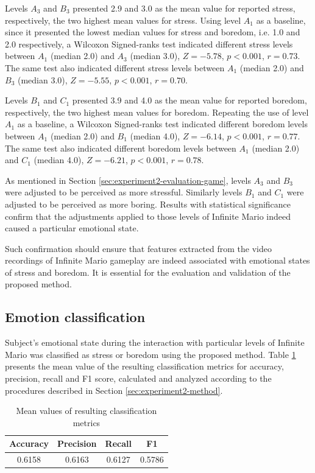 Levels $A_3$ and $B_3$ presented 2.9 and 3.0 as the mean value for reported stress, respectively, the two highest mean values for stress. Using level $A_1$ as a baseline, since it presented the lowest median values for stress and boredom, i.e. 1.0 and 2.0 respectively, a Wilcoxon Signed-ranks test indicated different stress levels between $A_1$ (median 2.0) and $A_3$ (median 3.0), $Z=-5.78$, $p < 0.001$, $r=0.73$. The same test also indicated different stress levels between $A_1$ (median 2.0) and $B_3$ (median 3.0), $Z=-5.55$, $p < 0.001$, $r=0.70$.

Levels $B_1$ and $C_1$ presented 3.9 and 4.0 as the mean value for reported boredom, respectively, the two highest mean values for boredom. Repeating the use of level $A_1$ as a baseline, a Wilcoxon Signed-ranks test indicated different boredom levels between $A_1$ (median 2.0) and $B_1$ (median 4.0), $Z=-6.14$, $p < 0.001$, $r=0.77$. The same test also indicated different boredom levels between $A_1$ (median 2.0) and $C_1$ (median 4.0), $Z=-6.21$, $p < 0.001$, $r=0.78$.

As mentioned in Section \ref{sec:experiment2-evaluation-game}, levels $A_3$ and $B_3$ were adjusted to be perceived as more stressful. Similarly levels $B_1$ and $C_1$ were adjusted to be perceived as more boring. Results with statistical significance confirm that the adjustments applied to those levels of Infinite Mario indeed caused a particular emotional state.

Such confirmation should ensure that features extracted from the video recordings of Infinite Mario gameplay are indeed associated with emotional states of stress and boredom. It is essential for the evaluation and validation of the proposed method.

\subsection{Emotion classification}

Subject's emotional state during the interaction with particular levels of Infinite Mario was classified as stress or boredom using the proposed method. Table \ref{table:experiment2-result-metrics-mean} presents the mean value of the resulting classification metrics for accuracy, precision, recall and F1 score, calculated and analyzed according to the procedures described in Section \ref{sec:experiment2-method}.

\begin{table}[ht]
    \centering
    \caption{Mean values of resulting classification metrics}
    \label{table:experiment2-result-metrics-mean}
    \begin{tabular}[l]{@{}cccc}
        \hline
            \textbf{Accuracy} & \textbf{Precision} & \textbf{Recall} & \textbf{F1}\\
        \hline
            0.6158 & 0.6163 & 0.6127 & 0.5786 \\ %
        \hline
    \end{tabular}
\end{table}

